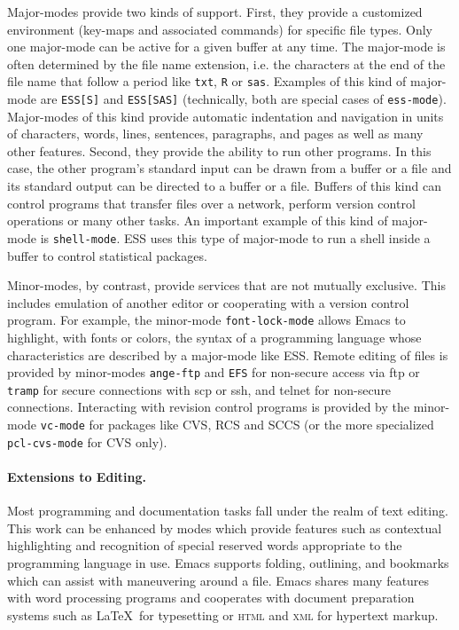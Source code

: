 \documentclass{article}
\newcommand{\stexttt}[1]{{\small\texttt{#1}}}
\begin{document}
Major-modes provide two kinds of support.
First, they provide a customized environment (key-maps and associated
commands) for specific file types.  Only one major-mode can be active
for a given buffer at any time.  The major-mode is often determined by
the file name extension, i.e. the characters at the end of the file
name that follow a period like \stexttt{txt}, \stexttt{R} or
\stexttt{sas}.
Examples of this kind of major-mode are \stexttt{ESS[S]} and \stexttt{ESS[SAS]}
(technically, both are special cases of \stexttt{ess-mode}).
Major-modes of this
kind provide automatic indentation and navigation in units of characters,
words, lines, sentences, paragraphs, and pages as well as many other
features.
Second, they provide the ability to run other programs.
In this case, the other program's standard input can be drawn from a buffer
or a file and its standard output can be directed to a buffer or a
file.  Buffers of this kind can control programs that transfer files
over a network, perform version control operations or many other
tasks.  An important example of this kind of major-mode is
\stexttt{shell-mode}.  ESS uses this type of major-mode to run a shell
inside a buffer to control statistical packages.

Minor-modes, by contrast, provide services that are not mutually
exclusive.  This includes emulation of another editor or cooperating
with a version control program.  For example, the minor-mode
\stexttt{font-lock-mode} allows Emacs to highlight, with fonts or
colors, the syntax of a programming language whose characteristics are
described by a major-mode like ESS.  Remote editing of files is
provided by minor-modes \stexttt{ange-ftp} and \stexttt{EFS} for
non-secure access via ftp or \stexttt{tramp} for secure connections
with scp or ssh, and telnet for non-secure connections.
Interacting with revision control
programs is provided by the minor-mode \stexttt{vc-mode} for packages
like CVS, RCS and SCCS (or the more
specialized \stexttt{pcl-cvs-mode} for CVS only).

\paragraph{Extensions to Editing.}
Most programming and documentation tasks fall under the realm of text
editing.  This work can be enhanced by modes which provide features such
as contextual highlighting and recognition of special reserved words
appropriate to the programming language in use.  Emacs supports
folding, outlining, and bookmarks which can assist with maneuvering
around a file.  Emacs shares many features with word processing
programs and cooperates with document preparation systems
such as \LaTeX\ for typesetting or  \textsc{html} and \textsc{xml}
for hypertext markup.
\end{document}

